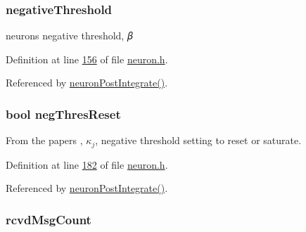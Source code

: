 \hypertarget{structneuron_state_a678bcd9f031e290178cd5d2855e74279}{}
\subsubsection[{negative\+Threshold}]{ negative\+Threshold}\label{structneuron_state_a678bcd9f031e290178cd5d2855e74279}


neuron\textquotesingle{}s negative threshold, 𝛽 



Definition at line \hyperlink{neuron_8h_source_l00156}{156} of file \hyperlink{neuron_8h_source}{neuron.\+h}.



Referenced by \hyperlink{neuron_8c_source_l00214}{neuron\+Post\+Integrate()}.

\hypertarget{structneuron_state_a3ec480684e7a2cfc67a8ef7ac1bf57b9}{}
\subsubsection[{neg\+Thres\+Reset}]{\setlength{\rightskip}{0pt plus 5cm}bool neg\+Thres\+Reset}\label{structneuron_state_a3ec480684e7a2cfc67a8ef7ac1bf57b9}


From the paper\textquotesingle{}s , $𝜅_j$, negative threshold setting to reset or saturate. 



Definition at line \hyperlink{neuron_8h_source_l00182}{182} of file \hyperlink{neuron_8h_source}{neuron.\+h}.



Referenced by \hyperlink{neuron_8c_source_l00214}{neuron\+Post\+Integrate()}.

\hypertarget{structneuron_state_ab8f63a1dfdb2992657530ff8a63fdc01}{}
\subsubsection[{rcvd\+Msg\+Count}]{ rcvd\+Msg\+Count}\label{structneuron_state_ab8f63a1dfdb2992657530ff8a63fdc01}


